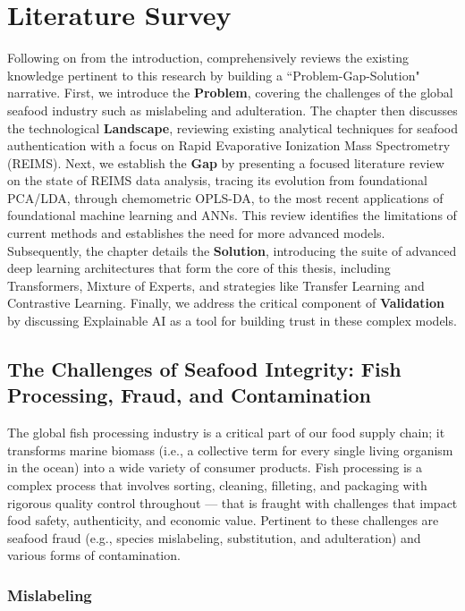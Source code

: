 \chapter{Literature Survey}
\label{chapter:literature-survey}

Following on from the introduction,  comprehensively reviews the existing knowledge pertinent to this research by building a ``Problem-Gap-Solution" narrative. First, we introduce the \textbf{Problem}, covering the challenges of the global seafood industry such as mislabeling and adulteration. The chapter then discusses the technological \textbf{Landscape}, reviewing existing analytical techniques for seafood authentication with a focus on Rapid Evaporative Ionization Mass Spectrometry (REIMS). Next, we establish the \textbf{Gap} by presenting a focused literature review on the state of REIMS data analysis, tracing its evolution from foundational PCA/LDA, through chemometric OPLS-DA, to the most recent applications of foundational machine learning and ANNs. This review identifies the limitations of current methods and establishes the need for more advanced models. Subsequently, the chapter details the \textbf{Solution}, introducing the suite of advanced deep learning architectures that form the core of this thesis, including Transformers, Mixture of Experts, and strategies like Transfer Learning and Contrastive Learning. Finally, we address the critical component of \textbf{Validation} by discussing Explainable AI as a tool for building trust in these complex models.

\section{The Challenges of Seafood Integrity: Fish Processing, Fraud, and Contamination}

The global fish processing industry is a critical part of our food supply chain; it transforms marine biomass (i.e., a collective term for every single living organism in the ocean) into a wide variety of consumer products. Fish processing is a complex process that involves sorting, cleaning, filleting, and packaging with rigorous quality control throughout --- that is fraught with challenges that impact food safety, authenticity, and economic value. Pertinent to these challenges are seafood fraud (e.g., species mislabeling, substitution, and adulteration) and various forms of contamination.

\subsection{Mislabeling}

